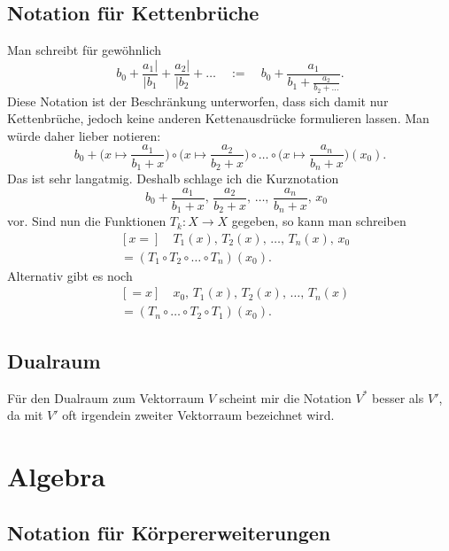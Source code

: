 \documentclass[a4paper,11pt,fleqn,twoside,BCOR=16mm]{scrartcl}
\begin{document}
\subsection{Notation für Kettenbrüche}
Man schreibt für gewöhnlich
\begin{equation}
b_0 + \frac{a_1|}{|b_1} + \frac{a_2|}{|b_2} + \ldots
\quad:=\quad b_0+\frac{a_1}{b_1+\frac{a_2}{b_2+\ldots}}.
\end{equation}
Diese Notation ist der Beschränkung unterworfen, dass sich damit
nur Kettenbrüche, jedoch keine anderen Kettenausdrücke formulieren
lassen. Man würde daher lieber notieren:
\begin{equation}
b_0+\Big(x\mapsto\frac{a_1}{b_1+x}\Big)
\circ\Big(x\mapsto\frac{a_2}{b_2+x}\Big)
\circ\ldots\circ\Big(x\mapsto\frac{a_n}{b_n+x}\Big)(x_0).
\end{equation}
Das ist sehr langatmig. Deshalb schlage ich die Kurznotation
\begin{equation}
[x{=}]\quad b_0+\frac{a_1}{b_1+x},\,\frac{a_2}{b_2+x},\,\ldots,\,
\frac{a_n}{b_n+x},\,x_0
\end{equation}
vor. Sind nun die Funktionen $T_k\colon X\to X$ gegeben, so
kann man schreiben
\begin{equation}
\begin{split}
& [x{=}]\quad T_1(x),\,T_2(x),\,\ldots,\,T_n(x),\,x_0\\
&= (T_1\circ T_2\circ\ldots\circ T_n)(x_0).
\end{split}
\end{equation}
Alternativ gibt es noch
\begin{equation}
\begin{split}
& [{=}x]\quad x_0,\, T_1(x),\, T_2(x),\,\ldots,\, T_n(x)\\
&= (T_n\circ\ldots\circ T_2\circ T_1)(x_0).
\end{split}
\end{equation}

\subsection{Dualraum}
Für den Dualraum zum Vektorraum $V$ scheint mir die Notation $V^\ast$
besser als $V'$, da mit $V'$ oft irgendein zweiter Vektorraum
bezeichnet wird.

\section{Algebra}
\subsection{Notation für Körpererweiterungen}
\end{document}
